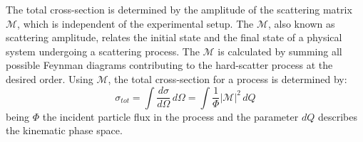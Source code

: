 The total cross-section is determined by the amplitude of the scattering matrix $\mathcal{M}$, 
which is independent of the experimental setup. The $\mathcal{M}$, also known as scattering amplitude, 
relates the initial state and the final state of a physical system undergoing a scattering process.
The $\mathcal{M}$ is calculated by summing all possible Feynman diagrams contributing to the hard-scatter
process at the desired order.
Using $\mathcal{M}$, the total cross-section for a process is determined by:
\begin{equation}\label{eq:chap1:Pheno:XS}
	\sigma_{tot} = \int \frac{d\sigma}{d\Omega} \, d\Omega = \int \frac{1}{\Phi} |\mathcal{M}|^{2}\, dQ
\end{equation}
being $\Phi$ the incident particle flux in the process and the parameter $dQ$ describes the kinematic phase space.







\begin{comment}

%
%
asdf
%

\end{comment}
